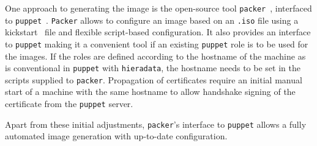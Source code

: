
One approach to generating the image is the open-source tool
\texttt{packer}~\cite{packer}, interfaced to \texttt{puppet}~\cite{puppet}.
\texttt{Packer} allows to configure an image based on an \texttt{.iso} file using a kickstart~\cite{kickstart} file and flexible script-based configuration. 
It also provides an interface to \texttt{puppet} making it a convenient tool if an existing \texttt{puppet} role is to be used for the images. If the roles are defined according to the hostname of the machine as is conventional in \texttt{puppet} with \texttt{hieradata}, the hostname needs to be set in the scripts supplied to \texttt{packer}. Propagation of certificates require an initial manual start of a machine with the same hostname to allow handshake signing of the certificate from the \texttt{puppet} server.

Apart from these initial adjustments, \texttt{packer}'s interface to \texttt{puppet} allows a fully automated image generation with up-to-date configuration.
